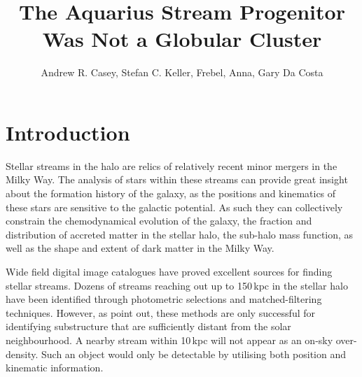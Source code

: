 \documentclass{emulateapj}
\begin{document}
\title{The Aquarius Stream Progenitor Was Not a Globular Cluster}


\author{Andrew R. Casey, Stefan C. Keller, Frebel, Anna, Gary Da Costa}


\begin{abstract}
\end{abstract}


\section{Introduction}

Stellar streams in the halo are relics of relatively recent minor mergers in the Milky Way. The analysis of stars within these streams can provide great insight about the formation history of the galaxy, as the positions and kinematics of these stars are sensitive to the galactic potential. As such they can collectively constrain the chemodynamical evolution of the galaxy, the fraction and distribution of accreted matter in the stellar halo, the sub-halo mass function, as well as the shape and extent of dark matter in the Milky Way. 

Wide field digital image catalogues have proved excellent sources for finding stellar streams. Dozens of streams reaching out up to 150\,kpc in the stellar halo have been identified through photometric selections and matched-filtering techniques. However, as \citet{Helmi;et-al_1999} point out, these methods are only successful for identifying substructure that are sufficiently distant from the solar neighbourhood. A nearby stream within 10\,kpc will not appear as an on-sky over-density. Such an object would only be detectable by utilising both position and kinematic information. 




\end{document}
